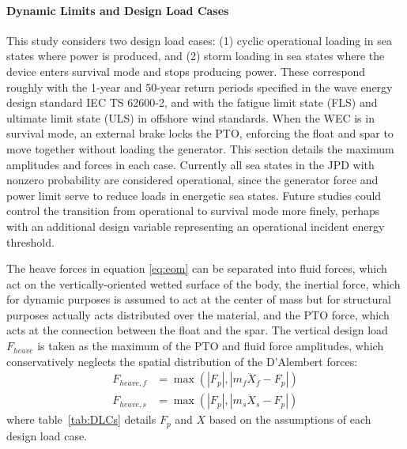 \paragraph{Dynamic Limits and Design Load Cases}
This study considers two design load cases: (1) cyclic operational loading in sea states where power is produced, and (2) storm loading in sea states where the device enters survival mode and stops producing power.
These correspond roughly with the 1-year and 50-year return periods specified in the wave energy design standard IEC TS 62600-2, and with the fatigue limit state (FLS) and ultimate limit state (ULS) in offshore wind standards.
When the WEC is in survival mode, an external brake locks the PTO, enforcing the float and spar to move together without loading the generator.
This section details the maximum amplitudes and forces in each case.
Currently all sea states in the JPD with nonzero probability are considered operational, since the generator force and power limit serve to reduce loads in energetic sea states.
Future studies could control the transition from operational to survival mode more finely, perhaps with an additional design variable representing an operational incident energy threshold.

The heave forces in equation \eqref{eq:eom} can be separated into fluid forces, which act on the vertically-oriented wetted surface of the body, the inertial force, which for dynamic purposes is assumed to act at the center of mass but for structural purposes actually acts distributed over the material, and the PTO force, which acts at the connection between the float and the spar.
The vertical design load $F_{heave}$ is taken as the maximum of the PTO and fluid force amplitudes, which conservatively neglects the spatial distribution of the D'Alembert forces:
\begin{equation}
\begin{aligned}
    F_{heave,f} &=\max(|F_p|, |m_f\ddot{X}_f-F_p|) \\
    F_{heave,s} &=\max(|F_p|, |m_s\ddot{X}_s-F_p|)
\end{aligned}
\end{equation}
where table~\ref{tab:DLCs} details $F_p$ and $X$ based on the assumptions of each design load case.

